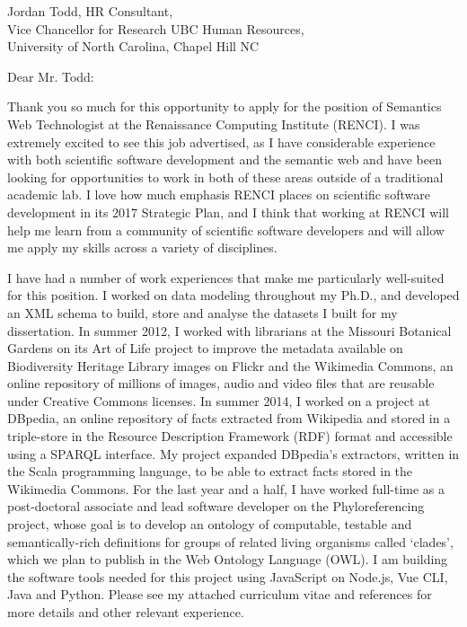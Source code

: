 \documentclass[12pt,letter]{letter}
\begin{document}
\begin{letter}{Jordan Todd, HR Consultant, \\
Vice Chancellor for Research UBC Human Resources, \\
University of North Carolina, 
Chapel Hill NC}

\opening{Dear Mr. Todd:}

Thank you so much for this opportunity to apply for the position of Semantics Web Technologist at the Renaissance Computing Institute (RENCI). I was extremely excited to see this job advertised, as I have considerable experience with both scientific software development and the semantic web and have been looking for opportunities to work in both of these areas outside of a traditional academic lab. I love how much emphasis RENCI places on scientific software development in its 2017 Strategic Plan, and I think that working at RENCI will help me learn from a community of scientific software developers and will allow me apply my skills across a variety of disciplines.

I have had a number of work experiences that make me particularly well-suited for this position. I worked on data modeling throughout my Ph.D., and developed an XML schema to build, store and analyse the datasets I built for my dissertation. In summer 2012, I worked with librarians at the Missouri Botanical Gardens on its Art of Life project to improve the metadata available on Biodiversity Heritage Library images on Flickr and the Wikimedia Commons, an online repository of millions of images, audio and video files that are reusable under Creative Commons licenses. In summer 2014, I worked on a project at DBpedia, an online repository of facts extracted from Wikipedia and stored in a triple-store in the Resource Description Framework (RDF) format and accessible using a SPARQL interface. My project expanded DBpedia's extractors, written in the Scala programming language, to be able to extract facts stored in the Wikimedia Commons. For the last year and a half, I have worked full-time as a post-doctoral associate and lead software developer on the Phyloreferencing project, whose goal is to develop an ontology of computable, testable and semantically-rich definitions for groups of related living organisms called `clades', which we plan to publish in the Web Ontology Language (OWL). I am building the software tools needed for this project using JavaScript on Node.js, Vue CLI, Java and Python. Please see my attached curriculum vitae and references for more details and other relevant experience.


\end{letter}
\end{document}
